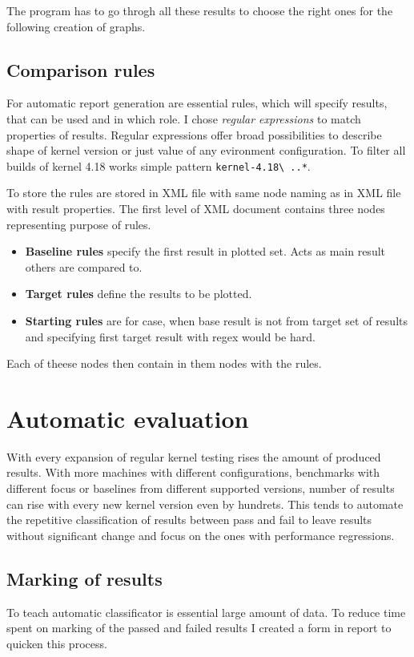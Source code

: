 The program has to go throgh all these results to choose the right ones for the
following creation of graphs.

\section{Comparison rules}
For automatic report generation are essential rules, which will specify results,
that can be used and in which role. I chose \emph{regular expressions} to match
properties of results. Regular expressions offer broad possibilities to describe
shape of kernel version or just value of any evironment configuration. To filter
all builds of kernel 4.18 works simple pattern \texttt{kernel-4.18\textbackslash
..*}.

To store the rules are stored in XML file with same node naming as in XML file
with result properties. The first level of XML document contains three nodes
representing purpose of rules.
\begin{itemize}
  \item \textbf{Baseline rules} specify the first result in plotted set. Acts as
    main result others are compared to.
  \item \textbf{Target rules} define the results to be plotted.
  \item \textbf{Starting rules} are for case, when base result is not from
    target set of results and specifying first target result with regex would be
    hard.
\end{itemize}
Each of theese nodes then contain in them nodes with the rules.


\chapter{Automatic evaluation}
With every expansion of regular kernel testing rises the amount of produced
results. With more machines with different configurations, benchmarks with
different focus or baselines from different supported versions, number of results
can rise with every new kernel version even by hundrets. This tends to automate
the repetitive classification of results between pass and fail to leave results
without significant change and focus on the ones with performance regressions.

\section{Marking of results}
To teach automatic classificator is essential large amount of data. To reduce
time spent on marking of the passed and failed results I created a form in
report to quicken this process.


